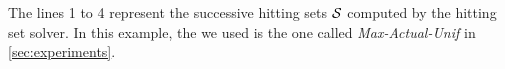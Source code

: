 The lines 1 to 4 represent the successive hitting sets $\mathcal{S}$ computed by the hitting set solver. 
In this example, the \grow we used is the one called \emph{Max-Actual-Unif} in \cref{sec:experiments}. 

% 
% 






